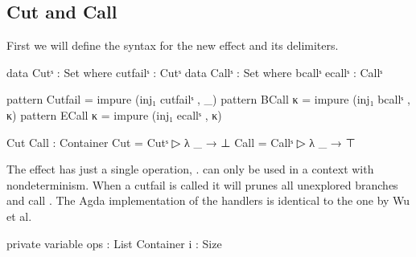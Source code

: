 \subsection{Cut and Call}

First we will define the syntax for the new effect and its delimiters.

\begin{code}
data Cutˢ : Set where cutfailˢ : Cutˢ
data Callˢ : Set where bcallˢ ecallˢ : Callˢ

pattern Cutfail = impure (inj₁ cutfailˢ , _)
pattern BCall κ = impure (inj₁ bcallˢ , κ)
pattern ECall κ = impure (inj₁ ecallˢ , κ)

Cut Call : Container
Cut   = Cutˢ    ▷ λ _ → ⊥
Call  = Callˢ   ▷ λ _ → ⊤
\end{code}
The  effect has just a single operation, .
 can only be used in a context with nondeterminism.
When a cutfail is called it will prunes all unexplored branches and call
.
The Agda implementation of the handlers is identical to the one by Wu et al.

\begin{code}[hide] %
private
  variable
    ops : List Container
    i : Size
\end{code}

